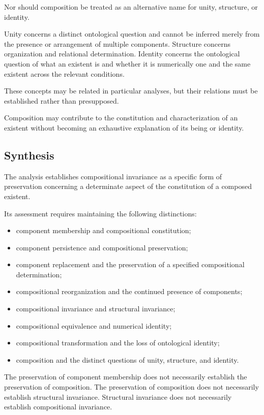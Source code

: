 Nor should composition be treated as an alternative
name for unity, structure, or identity.

Unity concerns a distinct ontological question and
cannot be inferred merely from the presence or arrangement
of multiple components. Structure concerns organization
and relational determination. Identity concerns the
ontological question of what an existent is and whether
it is numerically one and the same existent across
the relevant conditions.

These concepts may be related in particular analyses,
but their relations must be established rather than
presupposed.

Composition may contribute to the constitution and
characterization of an existent without becoming an
exhaustive explanation of its being or identity.

\subsection{Synthesis}

The analysis establishes compositional invariance as
a specific form of preservation concerning a determinate
aspect of the constitution of a composed existent.

Its assessment requires maintaining the following
distinctions:

\begin{itemize}
    \item component membership and compositional constitution;
    \item component persistence and compositional preservation;
    \item component replacement and the preservation of
          a specified compositional determination;
    \item compositional reorganization and the continued
          presence of components;
    \item compositional invariance and structural invariance;
    \item compositional equivalence and numerical identity;
    \item compositional transformation and the loss of
          ontological identity;
    \item composition and the distinct questions of unity,
          structure, and identity.
\end{itemize}

The preservation of component membership does not necessarily
establish the preservation of composition. The preservation
of composition does not necessarily establish structural
invariance. Structural invariance does not necessarily
establish compositional invariance.

